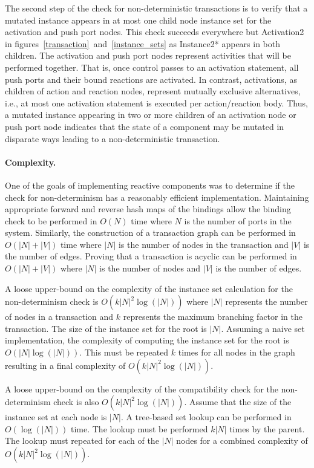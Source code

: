 The second step of the check for non-deterministic transactions is to verify that a mutated instance appears in at most one child node instance set for the activation and push port nodes.
This check succeeds everywhere but Activation2 in figures~\ref{transaction}~and~\ref{instance_sets} as Instance2* appears in both children.
The activation and push port nodes represent activities that will be performed together.
That is, once control passes to an activation statement, all push ports and their bound reactions are activated.
In contrast, activations, as children of action and reaction nodes, represent mutually exclusive alternatives, i.e., at most one activation statement is executed per action/reaction body.
Thus, a mutated instance appearing in two or more children of an activation node or push port node indicates that the state of a component may be mutated in disparate ways leading to a non-deterministic transaction.

\paragraph{Complexity.}
One of the goals of implementing reactive components was to determine if the check for non-determinism has a reasonably efficient implementation.
Maintaining appropriate forward and reverse hash maps of the bindings allow the binding check to be performed in $O(N)$ time where $N$ is the number of ports in the system.
Similarly, the construction of a transaction graph can be performed in $O(|N| + |V|)$ time where $|N|$ is the number of nodes in the transaction and $|V|$ is the number of edges.
Proving that a transaction is acyclic can be performed in $O(|N| + |V|)$ where $|N|$ is the number of nodes and $|V|$ is the number of edges.

A loose upper-bound on the complexity of the instance set calculation for the non-determinism check is $O(k |N|^2 \log (|N|))$ where $|N|$ represents the number of nodes in a transaction and $k$ represents the maximum branching factor in the transaction.
The size of the instance set for the root is $|N|$.
Assuming a naive set implementation, the complexity of computing the instance set for the root is $O(|N| \log (|N|))$.
This must be repeated $k$ times for all nodes in the graph resulting in a final complexity of $O(k |N|^2 \log (|N|))$.

A loose upper-bound on the complexity of the compatibility check for the non-determinism check is also $O(k |N|^2 \log (|N|))$.
Assume that the size of the instance set at each node is $|N|$.
A tree-based set lookup can be performed in $O(\log(|N|))$ time.
The lookup must be performed $k |N|$ times by the parent.
The lookup must repeated for each of the $|N|$ nodes for a combined complexity of $O(k |N|^2 \log (|N|))$.

